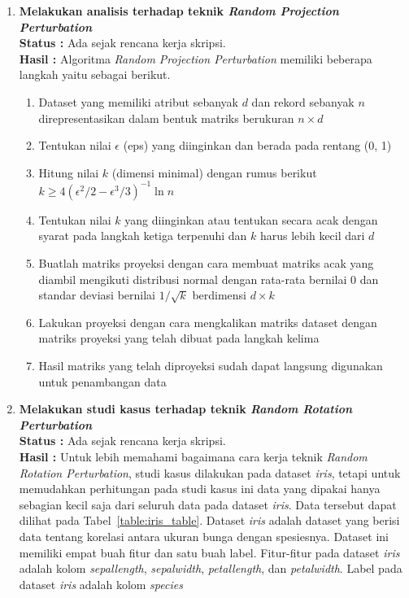 \documentclass[a4paper,twoside]{article}
\begin{document}
\begin{enumerate}
		\item \textbf{Melakukan analisis terhadap teknik \textit{Random Projection Perturbation}}\\
		{\bf Status :} Ada sejak rencana kerja skripsi.\\
		{\bf Hasil :} Algoritma \textit{Random Projection Perturbation} memiliki beberapa langkah yaitu sebagai berikut.
		\begin{enumerate}
			\item Dataset yang memiliki atribut sebanyak \(d\) dan rekord sebanyak \(n\) direpresentasikan dalam bentuk matriks berukuran \(n \times d\)
			\item Tentukan nilai \(\epsilon\) (eps) yang diinginkan dan berada pada rentang (0, 1)
			\item Hitung nilai \(k\) (dimensi minimal) dengan rumus berikut \(k \geq 4(\epsilon^{2}/2-\epsilon^{3}/3)^{-1}\ln{n}\)
			\item Tentukan nilai \(k\) yang diinginkan atau tentukan secara acak dengan syarat pada langkah ketiga terpenuhi dan \(k\) harus lebih kecil dari \(d\)
			\item Buatlah matriks proyeksi dengan cara membuat matriks acak yang diambil mengikuti distribusi normal dengan rata-rata bernilai 0 dan standar deviasi bernilai \(1/\sqrt{k}\) berdimensi \(d \times k\)
			\item Lakukan proyeksi dengan cara mengkalikan matriks dataset dengan matriks proyeksi yang telah dibuat pada langkah kelima
			\item Hasil matriks yang telah diproyeksi sudah dapat langsung digunakan untuk penambangan data
		\end{enumerate}

		\item \textbf{Melakukan studi kasus terhadap teknik \textit{Random Rotation Perturbation}}\\
		{\bf Status :} Ada sejak rencana kerja skripsi.\\
		{\bf Hasil :} Untuk lebih memahami bagaimana cara kerja teknik \textit{Random Rotation Perturbation}, studi kasus dilakukan pada dataset \textit{iris}, tetapi untuk memudahkan perhitungan pada studi kasus ini data yang dipakai hanya sebagian kecil saja dari seluruh data pada dataset \textit{iris}. Data tersebut dapat dilihat pada Tabel~\ref{table:iris_table}. Dataset \textit{iris} adalah dataset yang berisi data tentang korelasi antara ukuran bunga dengan spesiesnya. Dataset ini memiliki empat buah fitur dan satu buah label. Fitur-fitur pada dataset \textit{iris} adalah kolom \textit{sepal\textunderscore length}, \textit{sepal\textunderscore width}, \textit{petal\textunderscore length}, dan \textit{petal\textunderscore width}. Label pada dataset \textit{iris} adalah kolom \textit{species}


\end{enumerate}
\end{document}
